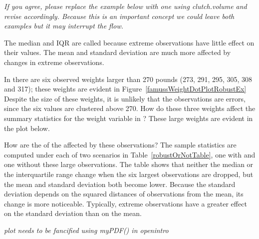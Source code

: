 \begin{doublespace}
\textit{If you agree, please replace the example below with one using clutch.volume and revise accordingly.  Because this is an important concept we could  leave both examples but it may interrupt the flow.}

The median and IQR are called  because extreme observations have little effect on their values. The mean and standard deviation are much more affected by changes in extreme observations.

In  there are six observed weights larger than 270 pounds (273, 291, 295, 305, 308 and 317); these weights are evident in Figure~\ref{famussWeightDotPlotRobustEx} Despite the size of these weights, it is unlikely that the observations are errors, since the six values are clustered above 270. How do these three weights affect the summary statistics for the weight variable in ?  These large weights are evident in the plot below.

How are the  of the  affected by these observations?  The sample statistics are computed under each of two scenarios in Table~\ref{robustOrNotTable},  one with and one without these large observations. The table shows that neither the median or the interquartile range change when the six largest observations are dropped, but the mean and standard deviation both become lower.  Because the standard deviation depends on the squared distances of observations from the mean, its change is more noticeable.  Typically, extreme observations have a greater effect on the standard deviation than on the mean.

\textit{plot needs to be fancified using myPDF() in openintro}


\end{doublespace}
